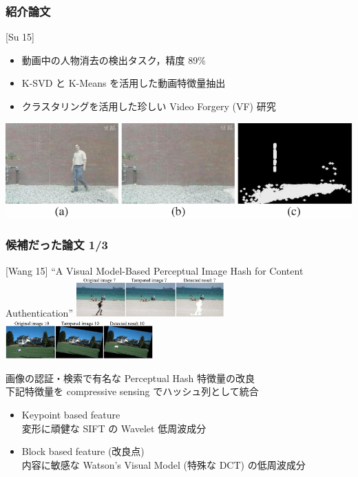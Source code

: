 \begin{frame}[plain]\frametitle{}
\titlepage %
\end{frame}


\begin{frame}\frametitle{紹介論文}
\begin{block}{[Su 15]}
\end{block}
\begin{itemize}
    \item 動画中の人物消去の検出タスク，精度 89\%
    \item K-SVD と K-Means を活用した動画特徴量抽出
    \item クラスタリングを活用した珍しい Video Forgery (VF) 研究
\end{itemize}
\includegraphics[scale=0.3]{figure/result2.png}
\end{frame}


\begin{frame}\frametitle{候補だった論文 1/3}
\begin{block}{[Wang 15]}
``A Visual Model-Based Perceptual Image Hash for Content Authentication''
\cite{Wang2015}
\includegraphics[height=1.5cm]{figure/wang0.png}
\includegraphics[height=1.5cm]{figure/wang1.png}
\end{block}
画像の認証・検索で有名な Perceptual Hash 特徴量の改良 \\
下記特徴量を compressive sensing でハッシュ列として統合
\begin{itemize}
    \item Keypoint based feature \\
        変形に頑健な SIFT の Wavelet 低周波成分
    \item Block based feature (改良点) \\
        内容に敏感な Watson's Visual Model (特殊な DCT) の低周波成分
\end{itemize}
\end{frame}



